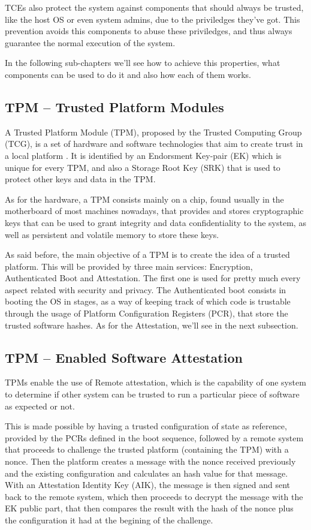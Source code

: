 TCEs also protect the system against components that should always be trusted, like the host OS or even system admins, due to the priviledges they've got. This prevention avoids this components to abuse these priviledges, and thus always guarantee the normal execution of the system. 

In the following sub-chapters we'll see how to achieve this properties, what components can be used to do it and also how each of them works.

\subsection{TPM – Trusted Platform Modules }

A Trusted Platform Module (TPM), proposed by the Trusted Computing Group (TCG), is a set of hardware and software technologies that aim to create trust in a local platform \cite{sgxCloudThesis}. It is identified by an Endorsment Key-pair (EK) which is unique for every TPM, and also a Storage Root Key (SRK) that is used to protect other keys and data in the TPM. 

As for the hardware, a TPM consists mainly on a chip, found usually in the motherboard of most machines nowadays, that provides and stores cryptographic keys that can be used to grant integrity and data confidentiality to the system, as well as persistent and volatile memory to store these keys. 

As said before, the main objective of a TPM is to create the idea of a trusted platform. This will be  provided by three main services: Encryption, Authenticated Boot and Attestation. The first one is used for pretty much every aspect related with security and privacy. The Authenticated boot consists in booting the OS in stages, as a way of keeping track of which code is trustable through the usage of Platform Configuration Registers (PCR), that store the trusted software hashes. As for the Attestation, we'll see in the next subsection.


\subsection{TPM – Enabled Software Attestation}


TPMs enable the use of Remote attestation, which is the capability of one system to determine if other system can be trusted to run a particular piece of software as expected or not.

This is made possible by having a trusted configuration of state as reference, provided by the PCRs defined in the boot sequence, followed by a remote system that proceeds to challenge the trusted platform (containing the TPM) with a nonce. Then the platform creates a message with the nonce received previously and the existing configuration and calculates an hash value for that message. With an Attestation Identity Key (AIK), the message is then signed and sent back to the remote system, which then proceeds to decrypt the message with the EK public part, that then compares the result with the hash of the nonce plus the configuration it had at the begining of the challenge. 

